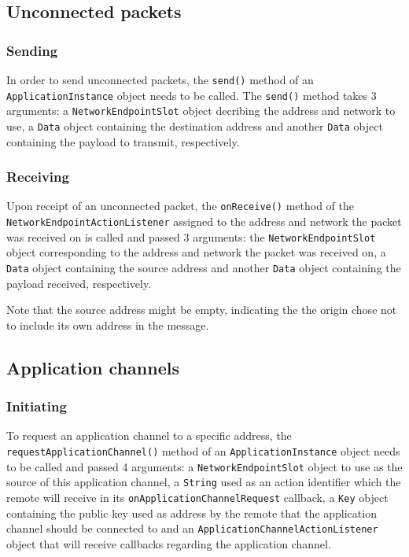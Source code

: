 \documentclass[a4paper,twocolumn]{article}
\newcommand{\code}[1]{\texttt{#1}}
\begin{document}
\subsection*{Unconnected packets}
\subsubsection*{Sending}
In order to send unconnected packets, the \code{send()} method of an
\code{ApplicationInstance} object needs to be called.
The \code{send()} method takes 3 arguments: a \code{NetworkEndpointSlot} object
decribing the address and network to use, a \code{Data} object containing the
destination address and another \code{Data} object containing the payload to
transmit, respectively.

\subsubsection*{Receiving}
Upon receipt of an unconnected packet, the \code{onReceive()} method of the
\code{NetworkEndpointActionListener} assigned to the address and network the
packet was received on is called and passed 3 arguments:
the \code{NetworkEndpointSlot} object corresponding to the address and network
the packet was received on, a \code{Data} object containing the source address
and another \code{Data} object containing the payload received, respectively.

Note that the source address might be empty, indicating the the origin chose not
to include its own address in the message.

\subsection*{Application channels}
\subsubsection*{Initiating}
To request an application channel to a specific address, the
\code{requestApplicationChannel()} method of an \code{ApplicationInstance}
object needs to be called and passed 4 arguments: a \code{NetworkEndpointSlot}
object to use as the source of this application channel, a \code{String} used as
an action identifier which the remote will receive in its
\code{onApplicationChannelRequest} callback, a \code{Key} object containing the
public key used as address by the remote that the application channel should be
connected to and an \code{ApplicationChannelActionListener} object that will
receive callbacks regarding the application channel.
\end{document}
